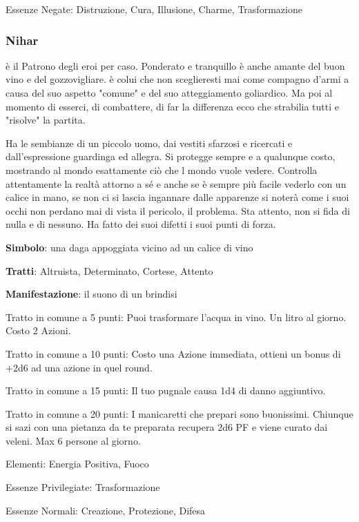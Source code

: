 \documentclass[a4paper,11pt,twoside,openany]{book}
\begin{document}
{Essenze Negate: Distruzione, Cura, Illusione, Charme, Trasformazione

\subsubsection{Nihar}

\label{nihar}

è il Patrono degli eroi per caso. Ponderato e tranquillo è anche amante del buon vino e del gozzovigliare. è colui che non sceglieresti mai come compagno d'armi a causa del suo aspetto "comune" e del suo atteggiamento goliardico. Ma poi al momento di esserci, di combattere, di far la differenza ecco che strabilia tutti e "risolve" la partita.

Ha le sembianze di un piccolo uomo, dai vestiti sfarzosi e ricercati e dall'espressione guardinga ed allegra. Si protegge sempre e a qualunque costo, mostrando al mondo esattamente ciò che l mondo vuole vedere. Controlla attentamente la realtà attorno a sé e anche se è sempre più facile vederlo con un calice in mano, se non ci si lascia ingannare dalle apparenze si noterà come i suoi occhi non perdano mai di vista il pericolo, il problema. Sta attento, non si fida di nulla e di nessuno. Ha fatto dei suoi difetti i suoi punti di forza.

\textbf{Simbolo}: una daga appoggiata vicino ad un calice di vino

\textbf{Tratti}: Altruista, Determinato, Cortese, Attento

\textbf{Manifestazione}: il suono di un brindisi

\bigskip

Tratto in comune a 5 punti: Puoi trasformare l'acqua in vino. Un litro al giorno. Costo 2 Azioni.

Tratto in comune a 10 punti: Costo una Azione immediata, ottieni un bonus di +2d6 ad una azione in quel round.

Tratto in comune a 15 punti: Il tuo pugnale causa 1d4 di danno aggiuntivo.

Tratto in comune a 20 punti: I manicaretti che prepari sono buonissimi. Chiunque si sazi con una pietanza da te preparata recupera 2d6 PF e viene curato dai veleni. Max 6 persone al giorno.

\bigskip

Elementi: Energia Positiva, Fuoco

\bigskip

Essenze Privilegiate: Trasformazione

Essenze Normali: Creazione, Protezione, Difesa

}
\end{document}
